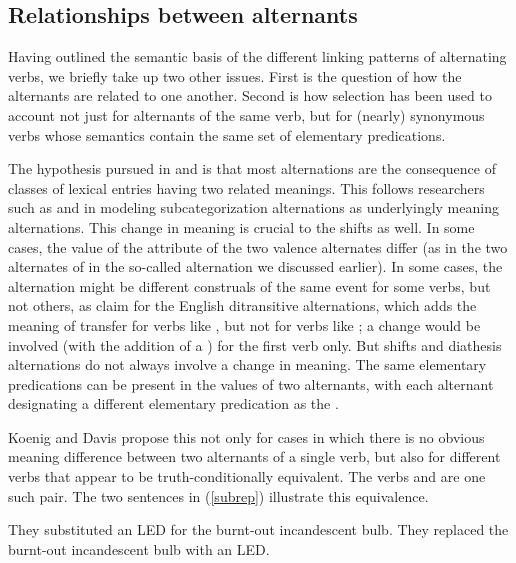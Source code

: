 \documentclass[output=paper
                ,modfonts
                ,nonflat
	        ,collection
	        ,collectionchapter
	        ,collectiontoclongg
 	        ,biblatex
                ,babelshorthands
                ,newtxmath
                ,draftmode
                ,colorlinks, citecolor=brown
]{./langsci/langscibook}
\begin{document}
\subsection{Relationships between alternants}

Having outlined the semantic basis of the different linking patterns of alternating verbs, we briefly take up two other issues.
First is the question of how the alternants are related to one another.
Second is how  selection has been used to account not just for alternants of the same verb, but for (nearly) synonymous verbs whose semantics contain the same set of elementary predications.

The hypothesis pursued in \citet{Davis1996} and \citet{Davis2001}  is that 
most alternations are the consequence of classes of lexical entries having
two related meanings. This follows researchers such as \citet{Pinker1989} and \citet{Levin1993} in modeling subcategorization alternations as underlyingly meaning alternations. 
This change in meaning is crucial to the \citet{KoenigandDavis2006}  shifts as well. In some cases, the value of the \rels attribute of the two valence alternates differ (as in the two alternates of  in the so-called  alternation we discussed earlier).
In some cases, the alternation might be different construals of the same event for some verbs, but not others, as \citet{RappaportandLevin2008} claim for the English ditransitive  alternations, which adds the meaning of transfer for verbs like , but not for verbs like ; a  change would be involved (with the addition of a ) for the first verb only. But  shifts and diathesis alternations do not always involve a change in meaning. The same elementary predications can be present in the  values of two alternants, with each alternant designating a different elementary predication as the . 

Koenig and Davis propose this not only for cases in which there is no obvious meaning difference between two alternants of a single verb, but also for different verbs that appear to be truth-conditionally equivalent.
The verbs  and  are one such pair.
The two sentences in (\ref{subrep}) illustrate this equivalence.

\begin{exe}
\ex\label{subrep}
\begin{xlist}
\ex\label{subrepa}They substituted an LED for the burnt-out incandescent bulb.
\ex\label{subrepb}They replaced the burnt-out incandescent bulb with an LED.
\end{xlist}
\end{exe}
\end{document}
